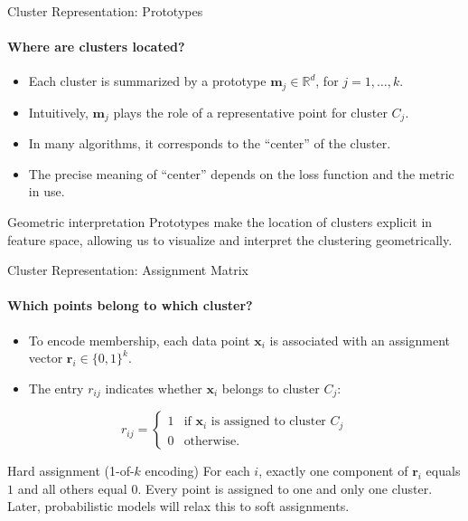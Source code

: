 \begin{frame}{Cluster Representation: Prototypes}
  \framesubtitle{Where are clusters located?}
  \begin{itemize}
    \item Each cluster is summarized by a \alert{prototype} $\mathbf{m}_j\in\mathbb{R}^d$,
          for $j=1,\ldots,k$.
    \item Intuitively, $\mathbf{m}_j$ plays the role of a \alert{representative point} for
          cluster $C_j$.
    \item In many algorithms, it corresponds to the ``center'' of the cluster.
    \item The precise meaning of ``center'' depends on the loss function and the metric in use.
  \end{itemize}
  \begin{block}{Geometric interpretation}
    Prototypes make the location of clusters explicit in feature space, allowing us to
    visualize and interpret the clustering geometrically.
  \end{block}
\end{frame}

\begin{frame}{Cluster Representation: Assignment Matrix}
  \framesubtitle{Which points belong to which cluster?}
  \begin{itemize}
    \item To encode membership, each data point $\mathbf{x}_i$ is associated with an
          \alert{assignment vector} $\mathbf{r}_i\in\{0,1\}^k$.
    \item The entry $r_{ij}$ indicates whether $\mathbf{x}_i$ belongs to cluster $C_j$:
  \end{itemize}
  \[
  r_{ij}=
  \begin{cases}
  1 & \text{if } \mathbf{x}_i \text{ is assigned to cluster } C_j\\
  0 & \text{otherwise.}
  \end{cases}
  \]
  \begin{alertblock}{Hard assignment (1-of-$k$ encoding)}
    For each $i$, exactly one component of $\mathbf{r}_i$ equals $1$ and all others equal $0$.
    Every point is assigned to one and only one cluster. Later, probabilistic models will
    relax this to \alert{soft assignments}.
  \end{alertblock}
\end{frame}

